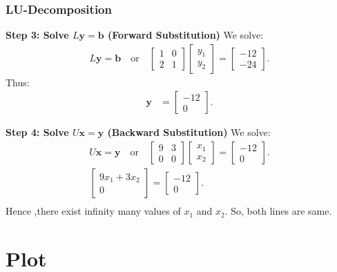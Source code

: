 \documentclass{beamer}
\theoremstyle{remark}
\numberwithin{equation}{section}
\begin{document}
\begin{frame}
\frametitle{LU-Decomposition}
\textbf{Step 3: Solve $L\mathbf{y} = \mathbf{b}$ (Forward Substitution)}
	We solve:
	\begin{align}
		L\mathbf{y} = \mathbf{b} \quad \text{or} \quad \begin{bmatrix} 1 & 0 \\ 2 & 1 \end{bmatrix} \begin{bmatrix} y_1 \\ y_2 \end{bmatrix} = \begin{bmatrix} -12 \\ -24 \end{bmatrix}.
	\end{align}
	Thus:
	\begin{align}
		\mathbf{y} &= \begin{bmatrix} -12 \\ 0 \end{bmatrix}.
	\end{align}


	\textbf{Step 4: Solve $U\mathbf{x} = \mathbf{y}$ (Backward Substitution)}
	We solve:
	\begin{align}
		U\mathbf{x} = \mathbf{y} \quad \text{or} \quad \begin{bmatrix} 9 & 3 \\ 0 & 0 \end{bmatrix} \begin{bmatrix} x_1 \\ x_2 \end{bmatrix} = \begin{bmatrix} -12 \\ 0 \end{bmatrix}.\\
	 \begin{bmatrix} 9x_1 + 3x_2 \\ 0 \end{bmatrix} = \begin{bmatrix} -12 \\ 0 \end{bmatrix}.\\
	\end{align}
	Hence ,there exist infinity many values of $x_1$ and $x_2$.
	So, both lines are same.


\end{frame}

\section{Plot}
\end{document}
